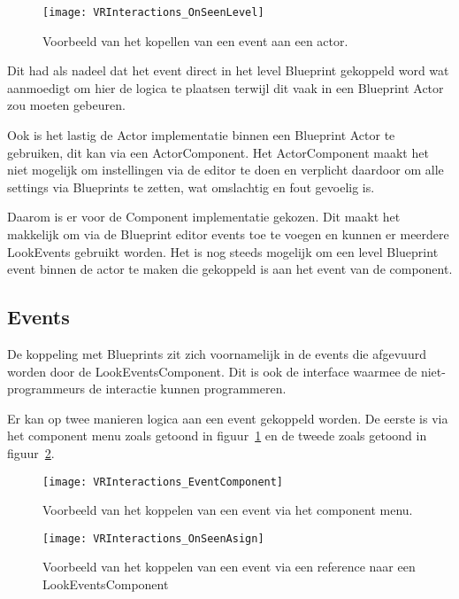 \begin{figure}[!ht]
  \centering
    \texttt{[image: VRInteractions\_OnSeenLevel]}
    \caption{Voorbeeld van het kopellen van een event aan een actor.}
\end{figure}

Dit had als nadeel dat het event direct in het level Blueprint gekoppeld word wat aanmoedigt om hier de logica te plaatsen terwijl dit vaak in een Blueprint Actor zou moeten gebeuren.

Ook is het lastig de Actor implementatie binnen een Blueprint Actor te gebruiken, dit kan via een ActorComponent. Het ActorComponent maakt het niet mogelijk om instellingen via de editor te doen en verplicht daardoor om alle settings via Blueprints te zetten, wat omslachtig en fout gevoelig is.

Daarom is er voor de Component implementatie gekozen. Dit maakt het makkelijk om via de Blueprint editor events toe te voegen en kunnen er meerdere LookEvents gebruikt worden. Het is nog steeds mogelijk om een level Blueprint event binnen de actor te maken die gekoppeld is aan het event van de component.

\subsection{Events}
De koppeling met Blueprints zit zich voornamelijk in de events die afgevuurd worden door de LookEventsComponent. Dit is ook de interface waarmee de niet-programmeurs de interactie kunnen programmeren.

Er kan op twee manieren logica aan een event gekoppeld worden. De eerste is via het component menu zoals getoond in figuur~\ref{fig:ComponentMenuEvent} en de tweede zoals getoond in figuur~\ref{fig:ComponentReferenceAsign}.

\begin{figure}[H]
  \centering
    \texttt{[image: VRInteractions\_EventComponent]}
    \caption{Voorbeeld van het koppelen van een event via het component menu.}
    \label{fig:ComponentMenuEvent}
\end{figure}

\begin{figure}[H]
  \centering
    \texttt{[image: VRInteractions\_OnSeenAsign]}
    \caption{Voorbeeld van het koppelen van een event via een reference naar een LookEventsComponent}
    \label{fig:ComponentReferenceAsign}
\end{figure}

